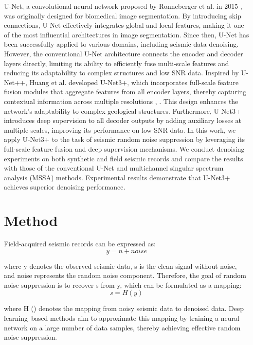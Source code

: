 \documentclass[preprint,12pt]{elsarticle}
\begin{document}
U-Net, a convolutional neural network proposed by Ronneberger et al. in 2015 \cite{ronneberger15}, was originally designed for biomedical image segmentation. By introducing skip connections, U-Net effectively integrates global and local features, making it one of the most influential architectures in image segmentation. Since then, U-Net has been successfully applied to various domains, including seismic data denoising. However, the conventional U-Net architecture connects the encoder and decoder layers directly, limiting its ability to efficiently fuse multi-scale features and reducing its adaptability to complex structures and low SNR data. Inspired by U-Net++, Huang et al. developed U-Net3+, which incorporates full-scale feature fusion modules that aggregate features from all encoder layers, thereby capturing contextual information across multiple resolutions \cite{zhou18}, \cite{huang20}. This design enhances the network’s adaptability to complex geological structures. Furthermore, U-Net3+ introduces deep supervision to all decoder outputs by adding auxiliary losses at multiple scales, improving its performance on low-SNR data. In this work, we apply U-Net3+ to the task of seismic random noise suppression by leveraging its full-scale feature fusion and deep supervision mechanisms. We conduct denoising experiments on both synthetic and field seismic records and compare the results with those of the conventional U-Net and multichannel singular spectrum analysis (MSSA) methods. Experimental results demonstrate that U-Net3+ achieves superior denoising performance.

\section{Method}
\label{sec2}
Field-acquired seismic records can be expressed as:
\begin{equation}
y = n + noise
\end{equation}

where y denotes the observed seismic data, s is the clean signal without noise, and noise represents the random noise component. Therefore, the goal of random noise suppression is to recover s from y, which can be formulated as a mapping:
\begin{equation}
s = H(y)
\end{equation}

where H () denotes the mapping from noisy seismic data to denoised data. Deep learning–based methods aim to approximate this mapping by training a neural network on a large number of data samples, thereby achieving effective random noise suppression.
\end{document}
